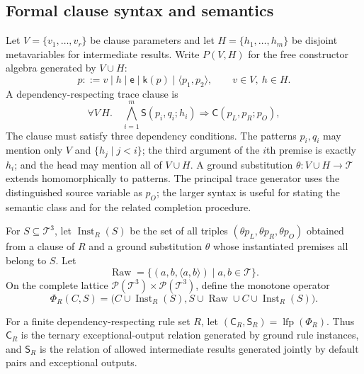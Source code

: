 \documentclass[runningheads]{llncs}
\newcommand{\Tree}{\mathcal{T}}
\newcommand{\Code}{\mathsf{C}}
\newcommand{\Step}{\mathsf{S}}
\newcommand{\pair}[2]{\langle #1,#2\rangle}
\begin{document}
\subsection{Formal clause syntax and semantics}
\label{sec:formal-language}

Let \(V=\{v_1,\ldots,v_r\}\) be clause parameters and let
\(H=\{h_1,\ldots,h_m\}\) be disjoint metavariables for intermediate results.
Write \(P(V,H)\) for the free constructor algebra generated by $V\cup H$:
\[
  p ::= v \mid h \mid \mathsf e \mid \mathsf k(p) \mid \pair{p_1}{p_2},
  \qquad v\in V,\ h\in H .
\]
A dependency-respecting trace clause is
\begin{equation}
 \forall V\,H.\quad
 \bigwedge_{i=1}^{m}\Step(p_i,q_i;h_i)
 \Longrightarrow \Code(p_L,p_R;p_O),
 \label{eq:formal-clause}
\end{equation}
The clause must satisfy three dependency conditions.  The patterns
\(p_i,q_i\) may mention only \(V\) and \(\{h_j\mid j<i\}\); the third argument
of the $i$th premise is exactly \(h_i\); and the head may mention all of
\(V\cup H\).  A ground substitution
\(\theta:V\cup H\to\Tree\) extends homomorphically to patterns.
The principal trace generator uses the distinguished source variable as
\(p_O\); the larger syntax is useful for stating the semantic class and for
the related completion procedure.

For $S\subseteq\Tree^3$, let \(\operatorname{Inst}_R(S)\) be the set of all
triples \((\theta p_L,\theta p_R,\theta p_O)\) obtained from a clause of $R$
and a ground substitution \(\theta\) whose instantiated premises all belong to
$S$.  Let
\[
 \operatorname{Raw}=\{(a,b,\pair{a}{b})\mid a,b\in\Tree\}.
\]
On the complete lattice
\(\mathcal P(\Tree^3)\times\mathcal P(\Tree^3)\), define the monotone operator
\begin{equation}
 \Phi_R(C,S)=
 \bigl(C\cup\operatorname{Inst}_R(S),
       S\cup\operatorname{Raw}\cup C\cup\operatorname{Inst}_R(S)\bigr).
 \label{eq:immediate-consequence}
\end{equation}

\begin{definition}
\label{def:relational-semantics}
For a finite dependency-respecting rule set $R$, let
\((\Code_R,\Step_R)=\operatorname{lfp}(\Phi_R)\).  Thus \(\Code_R\) is the
ternary exceptional-output relation generated by ground rule instances, and
\(\Step_R\) is the relation of allowed intermediate results generated jointly
by default pairs and exceptional outputs.
\end{definition}
\end{document}
